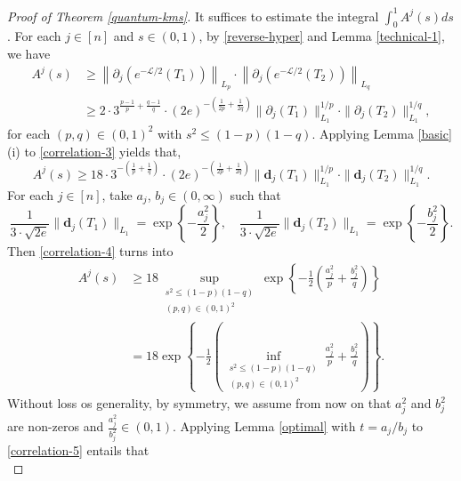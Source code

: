 \documentclass{amsbook}
\theoremstyle{definition}
\theoremstyle{remark}
\numberwithin{section}{chapter}
\numberwithin{equation}{chapter}
\newcommand{\1}{\mathbf{1}}
\newcommand{\La}{\mathcal{L}}
\newcommand{\dc}{\mathbf{d}}
\begin{document}
\begin{proof}[Proof of Theorem \ref{quantum-kms}]
It suffices to estimate the integral $\int_{0}^{1}A^{j}(s)ds$. 	For each $j\in [n]$ and $s\in (0,1)$, by \eqref{reverse-hyper} and Lemma \ref{technical-1}, we have
	\begin{equation}\label{correlation-3}
\begin{split}
		A^{j}(s)&\geq \left\|\partial_{j}\left(e^{-\La/2}(T_1)\right)\right\|_{L_{p}}\cdot\left\|\partial_{j}\left(e^{-\La/2}(T_2)\right)\right\|_{L_{q}}\\
       &\geq2\cdot3^{\frac{p-1}{p}+\frac{q-1}{q}}\cdot (2e)^{-(\frac{1}{2p}+\frac{1}{2q})}\|\partial_{j}(T_1)\|^{1/p}_{L_{1}}\cdot\|\partial_{j}(T_2)\|^{1/q}_{L_{1}},
\end{split}
	\end{equation}
	for each $(p,q)\in (0,1)^{2}$ with $s^{2}\leq (1-p)(1-q)$. Applying Lemma \ref{basic} (i) to \eqref{correlation-3} yields that,
	\begin{equation}\label{correlation-4}
		A^{j}(s)\geq 18\cdot3^{-(\frac{1}{p}+\frac{1}{q})}\cdot(2e)^{-(\frac{1}{2p}+\frac{1}{2q})}\|\dc_{j}(T_1)\|^{1/p}_{L_{1}}\cdot\|\dc_{j}(T_2)\|^{1/q}_{L_{1}}.
	\end{equation}
	For each $j\in [n]$, take $a_{j}$, $b_{j}\in (0,\infty)$ such that
	\begin{equation}\label{parameter}
		\frac{1}{3\cdot\sqrt{2e}}\|\dc_{j}(T_1)\|_{L_{1}}=\exp\left\{-\frac{a^{2}_{j}}{2}\right\},\quad	\frac{1}{3\cdot\sqrt{2e}}\|\dc_{j}(T_2)\|_{L_{1}}=\exp\left\{-\frac{b^{2}_{j}}{2}\right\}.
	\end{equation}
	Then \eqref{correlation-4} turns into
	\begin{equation}\label{correlation-5}
	\begin{split}
A^{j}(s)&\geq 18\sup_{\substack{s^{2}\leq (1-p)(1-q)\\(p,q)\in(0,1)^{2}}}\exp\left\{-\frac{1}{2}\left(\frac{a^{2}_{j}}{p}+\frac{b^{2}_{j}}{q}\right)\right\}\\
&=18\exp\left\{-\frac{1}{2}\left(\inf_{\substack{s^{2}\leq (1-p)(1-q)\\(p,q)\in(0,1)^{2}}}\frac{a^{2}_{j}}{p}+\frac{b^{2}_{j}}{q}\right)\right\}.
\end{split}	
	\end{equation}
	Without loss os generality, by symmetry, we assume from now on that $a^{2}_{j}$ and $b^{2}_{j}$ are non-zeros and $\frac{a^{2}_{j}}{b^{2}_{j}}\in(0,1)$. Applying Lemma \ref{optimal} with $t=a_{j}/b_j$  to \eqref{correlation-5} entails that
	\begin{equation}\label{correlation-6}

\end{equation}
\end{proof}
\end{document}
